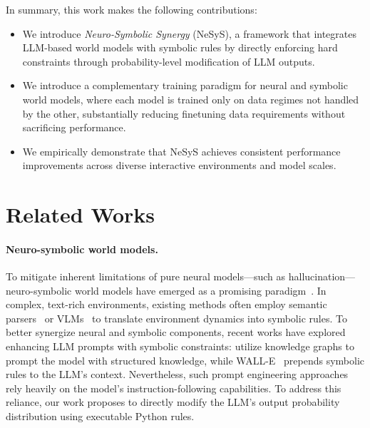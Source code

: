 \documentclass{article}
\theoremstyle{plain}
\theoremstyle{definition}
\theoremstyle{remark}
\newcommand{\ours}{{\sc NeSyS}\xspace}
\begin{document}
In summary, this work makes the following contributions:
\begin{itemize}
    \item We introduce \emph{Neuro-Symbolic Synergy} (\ours), a framework that integrates LLM-based world models with symbolic rules by directly enforcing hard constraints through probability-level modification of LLM outputs.
    \item We introduce a complementary training paradigm for neural and symbolic world models, where each model is trained only on data regimes not handled by the other, substantially reducing finetuning data requirements without sacrificing performance.
    \item We empirically demonstrate that \ours achieves consistent performance improvements across diverse interactive environments and model scales.
\end{itemize}

\section{Related Works}
\paragraph{Neuro-symbolic world models.} %
To mitigate inherent limitations of pure neural models—such as hallucination—neuro-symbolic world models have emerged as a promising paradigm~\citep{cano2025neurosymbolic, sehgal2023neurosymbolic, balloch2023neuro}. In complex, text-rich environments, existing methods often employ semantic parsers~\citep{agravante2023learning} or VLMs~\citep{liang2024visualpredicator} to translate environment dynamics into symbolic rules. To better synergize neural and symbolic components, recent works have explored enhancing LLM prompts with symbolic constraints: \citet{de2025neurosymbolic} utilize knowledge graphs to prompt the model with structured knowledge, while WALL-E~\citep{zhou2024wall,zhou2025wall} prepends symbolic rules to the LLM’s context. Nevertheless, such prompt engineering approaches rely heavily on the model's instruction-following capabilities. To address this reliance, our work proposes to directly modify the LLM's output probability distribution using executable Python rules.
\end{document}
